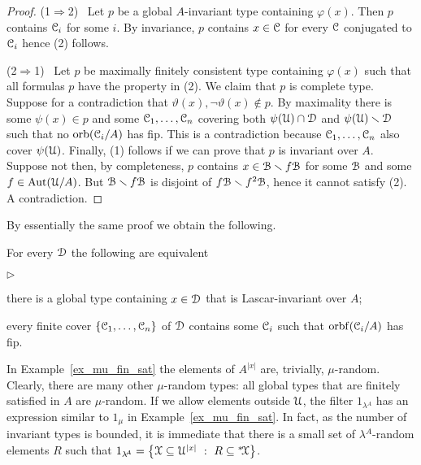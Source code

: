 \documentclass{amsproc}
\newcommand{\mylabel}[1]{{#1}\hfill}
\renewenvironment{itemize}
  {\begin{list}{$\triangleright$}{%
  \setlength{\parskip}{0mm}
  \setlength{\topsep}{.4\baselineskip}
  \setlength{\rightmargin}{0mm}
  \setlength{\listparindent}{0mm}
  \setlength{\itemindent}{0mm}
  \setlength{\labelwidth}{3ex}
  \setlength{\itemsep}{.2\baselineskip}
  \setlength{\parsep}{.2\baselineskip}
  \setlength{\partopsep}{0mm}
  \setlength{\labelsep}{1ex}
  \setlength{\leftmargin}{\labelwidth+\labelsep}
  \let\makelabel\mylabel}}{%
\end{list}}
\begin{document}
\begin{proof}
  (1$\Rightarrow$2) \ Let $p$ be a global $A$-invariant type containing $\varphi(x)$.
  Then $p$ contains $\EuScript C_i$ for some $i$.
  By invariance, $p$ contains $x\in\EuScript C$ for every $\EuScript C$ conjugated to $\EuScript C_i$ hence (2) follows.

  (2$\Rightarrow$1) \ Let $p$ be maximally finitely consistent type containing $\varphi(x)$ such that all formulas $p$ have the property in (2).
  We claim that $p$ is complete type.
  Suppose for a contradiction that $\vartheta(x),\neg\vartheta(x)\notin p$.
  By maximality there is some $\psi(x)\in p$ and some $\EuScript C_1,\dots,\EuScript C_n$ covering both $\psi(\EuScript U)\cap\EuScript D$ and $\psi(\EuScript U)\smallsetminus\EuScript D$ such that no ${\rm orb}(\EuScript C_i/A)$ has fip.
  This is a contradiction because $\EuScript C_1,\dots,\EuScript C_n$ also cover $\psi(\EuScript U)$.
  Finally, (1) follows if we can prove that $p$ is invariant over $A$.
  Suppose not then, by completeness, $p$ contains $x\in\EuScript B\smallsetminus f\EuScript B$ for some $\EuScript B$ and some $f\in{\rm Aut}(\EuScript U/A)$.
  But $\EuScript B\smallsetminus f\EuScript B$ is disjoint of $f\EuScript B\smallsetminus f^2\EuScript B$, hence it cannot satisfy (2).
  A contradiction.
\end{proof}

By essentially the same proof we obtain the following.

\begin{fact}\label{fact_Lig}
  For every $\EuScript D$ the following are equivalent
  \begin{itemize}
    \item [1.] there is a global type containing $x\in\EuScript D$ that is Lascar-invariant over $A$;
    \item [2.] every finite cover  $\{\EuScript C_1,\dots,\EuScript C_n\}$ of $\EuScript D$ contains some $\EuScript C_i$ such that ${\rm orbf}(\EuScript C_i/A)$ has fip.
  \end{itemize}
\end{fact}

In Example~\ref{ex_mu_fin_sat} the elements of $A^{|x|}$ are, trivially, $\mu$-random.
Clearly, there are many other $\mu$-random types: all global types that are finitely satisfied in $A$ are $\mu$-random.
If we allow elements outside $\EuScript U$, the filter $1_{\lambda\!^A}$ has an expression similar to $1_\mu$ in Example~\ref{ex_mu_fin_sat}.
In fact, as the number of invariant types is bounded, it is immediate that there is a small set of $\lambda\!^A$-random elements $R$ such that $1_{\lambda\!^A}=\big\{\EuScript X\subseteq\EuScript U^{|x|}\ :\ R\subseteq{}^*\!\EuScript X\big\}$.
\end{document}
